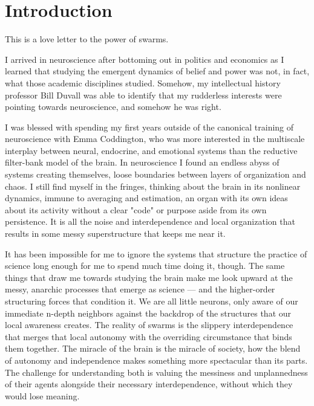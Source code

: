 
\chapter*{Introduction}

This is a love letter to the power of swarms.

I arrived in neuroscience after bottoming out in politics and economics as I learned that studying the emergent dynamics of belief and power was not, in fact, what those academic disciplines studied. Somehow, my intellectual history professor Bill Duvall was able to identify that my rudderless interests were pointing towards neuroscience, and somehow he was right.

I was blessed with spending my first years outside of the canonical training of neuroscience with Emma Coddington, who was more interested in the multiscale interplay between neural, endocrine, and emotional systems than the reductive filter-bank model of the brain. In neuroscience I found an endless abyss of systems creating themselves, loose boundaries between layers of organization and chaos. I still find myself in the fringes, thinking about the brain in its nonlinear dynamics, immune to averaging and estimation, an organ with its own ideas about its activity without a clear "code" or purpose aside from its own persistence. It is all the noise and interdependence and local organization that results in some messy superstructure that keeps me near it.

It has been impossible for me to ignore the systems that structure the practice of science long enough for me to spend much time doing it, though. The same things that draw me towards studying the brain make me look upward at the messy, anarchic processes that emerge as science --- and the higher-order structuring forces that condition it. We are all little neurons, only aware of our immediate n-depth neighbors against the backdrop of the structures that our local awareness creates. The reality of swarms is the slippery interdependence that merges that local autonomy with the overriding circumstance that binds them together. The miracle of the brain is the miracle of society, how the blend of autonomy and independence makes something more spectacular than its parts. The challenge for understanding both is valuing the messiness and unplannedness of their agents alongside their necessary interdependence, without which they would lose meaning.


